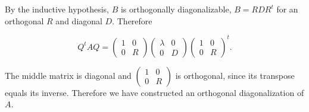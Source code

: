 By the inductive hypothesis, \(B\) is orthogonally diagonalizable, \(B = RDR^{t}\) for an orthogonal \(R\) and diagonal \(D\). Therefore

\[Q^{t}AQ = \begin{pmatrix}
1 & 0 \\
0 & R
\end{pmatrix}\begin{pmatrix}
\lambda & 0 \\
0 & D
\end{pmatrix}\begin{pmatrix}
1 & 0 \\
0 & R
\end{pmatrix}^{t}.\]

The middle matrix is diagonal and \(\begin{pmatrix}
1 & 0 \\
0 & R
\end{pmatrix}\) is orthogonal, since its transpose equals its inverse. Therefore we have constructed an orthogonal diagonalization of \(A\).
